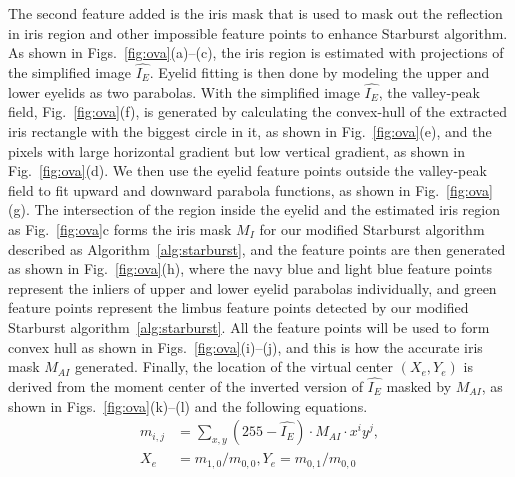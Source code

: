 \documentclass[sigconf]{acmart}
\begin{document}
The second feature added is the iris mask 
that is used to mask out the reflection in iris region and other impossible feature points to enhance Starburst algorithm.
As shown in Figs.~\ref{fig:ova}(a)--(c), the iris region is estimated with projections of the simplified image $\hat{I_E}$.
Eyelid fitting is then done by modeling the upper and lower eyelids as two parabolas.
With the simplified image $\hat{I_E}$, the valley-peak field, Fig.~\ref{fig:ova}(f),
is generated by calculating the convex-hull of the extracted iris rectangle with the biggest circle in it, as shown in Fig.~\ref{fig:ova}(e),
and the pixels with large horizontal gradient but low vertical gradient, as shown in Fig.~\ref{fig:ova}(d).
We then use the eyelid feature points outside the valley-peak field to fit upward and downward parabola functions, as shown in Fig.~\ref{fig:ova}(g).
The intersection of the region inside the eyelid and the estimated iris region as Fig.~\ref{fig:ova}{c} forms the iris mask $M_I$ for our modified Starburst algorithm described as Algorithm~\ref{alg:starburst}, and the feature points are then generated as shown in Fig.~\ref{fig:ova}(h), where the navy blue and light blue feature points represent the inliers of upper and lower eyelid parabolas individually, and green feature points represent the limbus feature points detected by our modified Starburst algorithm~\ref{alg:starburst}. All the feature points will be used to form convex hull as shown in Figs.~\ref{fig:ova}(i)--(j), and this is how the accurate iris mask $M_{AI}$ generated.
Finally, the location of the virtual center $(X_e, Y_e)$ is derived from the moment center of the inverted version of $\hat{I_E}$ masked by $M_{AI}$, as shown in Figs.~\ref{fig:ova}(k)--(l) and the following equations.
\begin{align}
m_{i, j} &= \sum_{x,y}{(255-\hat{I_E}) \cdot M_{AI} \cdot x^i y^j},\\
X_e &= m_{1,0}/m_{0,0}, Y_e = m_{0,1}/m_{0,0}
\end{align}
\end{document}
